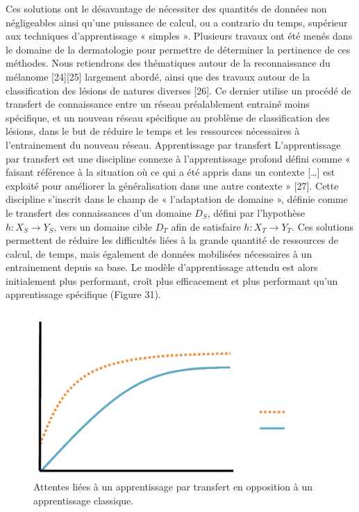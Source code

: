 Ces solutions ont le désavantage de nécessiter des quantités de données non négligeables ainsi qu’une puissance de calcul, ou a contrario du temps, supérieur aux techniques d’apprentissage « simples ».
Plusieurs travaux ont été menés dans le domaine de la dermatologie pour permettre de déterminer la pertinence de ces méthodes. Nous retiendrons des thématiques autour de la reconnaissance du mélanome [24][25] largement abordé, ainsi que des travaux autour de la classification des lésions de natures diverses [26]. Ce dernier utilise un procédé de transfert de connaissance entre un réseau préalablement entrainé moins spécifique, et un nouveau réseau spécifique au problème de classification des lésions, dans le but de réduire le temps et les ressources nécessaires à l’entrainement du nouveau réseau.
Apprentissage par transfert
L’apprentissage par transfert est une discipline connexe à l’apprentissage profond défini comme « faisant référence à la situation où ce qui a été appris dans un contexte […] est exploité pour améliorer la généralisation dans une autre contexte » [27]. Cette discipline s’inscrit dans le champ de « l’adaptation de domaine », définie comme le transfert des connaissances d’un domaine $D_S$, défini par l’hypothèse $h: X_S \rightarrow Y_S$, vers un domaine cible $D_T$ afin de satisfaire $h: X_T \rightarrow Y_T$.
Ces solutions permettent de réduire les difficultés liées à la grande quantité de ressources de calcul, de temps, mais également de données mobilisées nécessaires à un entrainement depuis sa base. Le modèle d’apprentissage attendu est alors initialement plus performant, croît plus efficacement et plus performant qu’un apprentissage spécifique (Figure 31).

\begin{figure}[H]
    \centering
    \includegraphics[width=\linewidth]{contents/chapter_3/resources/learning_curves.png}
    \caption{ Attentes liées à un apprentissage par transfert en opposition à un apprentissage classique.}
    \label{fig:learning_curves}
\end{figure}

